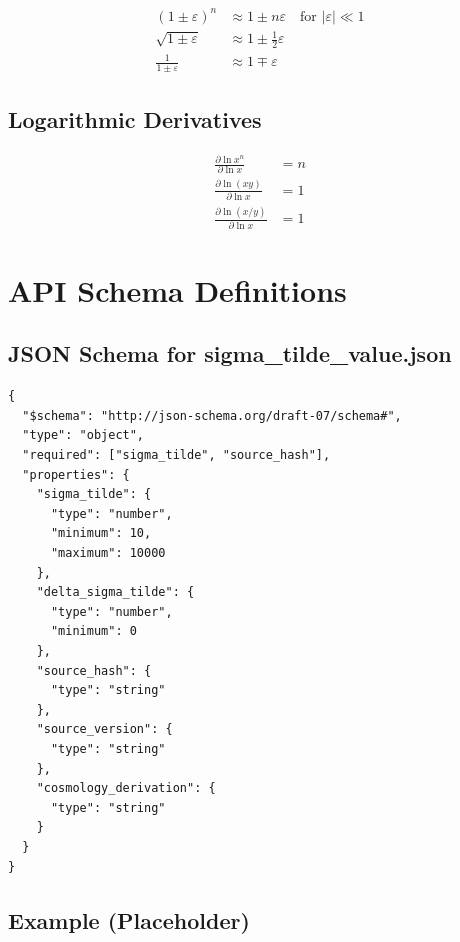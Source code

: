 \documentclass[11pt,letterpaper]{article}
\newcommand{\eps}{\varepsilon}
\begin{document}
\begin{align}
(1 \pm \eps)^n &\approx 1 \pm n\eps \quad \text{for } |\eps| \ll 1 \label{eq:power-approx} \\
\sqrt{1 \pm \eps} &\approx 1 \pm \frac{1}{2}\eps \label{eq:sqrt-approx} \\
\frac{1}{1 \pm \eps} &\approx 1 \mp \eps \label{eq:inv-approx}
\end{align}

\subsection{Logarithmic Derivatives}
\label{app:log-deriv}

\begin{align}
\frac{\partial \ln x^n}{\partial \ln x} &= n \label{eq:log-deriv-power} \\
\frac{\partial \ln (xy)}{\partial \ln x} &= 1 \label{eq:log-deriv-product} \\
\frac{\partial \ln (x/y)}{\partial \ln x} &= 1 \label{eq:log-deriv-ratio}
\end{align}

\section{API Schema Definitions}
\label{app:api-schema}

\subsection{JSON Schema for sigma\_tilde\_value.json}
\label{app:json-schema}

\begin{verbatim}
{
  "$schema": "http://json-schema.org/draft-07/schema#",
  "type": "object",
  "required": ["sigma_tilde", "source_hash"],
  "properties": {
    "sigma_tilde": {
      "type": "number",
      "minimum": 10,
      "maximum": 10000
    },
    "delta_sigma_tilde": {
      "type": "number",
      "minimum": 0
    },
    "source_hash": {
      "type": "string"
    },
    "source_version": {
      "type": "string"
    },
    "cosmology_derivation": {
      "type": "string"
    }
  }
}
\end{verbatim}

\subsection{Example (Placeholder)}
\label{app:example-json}
\end{document}
